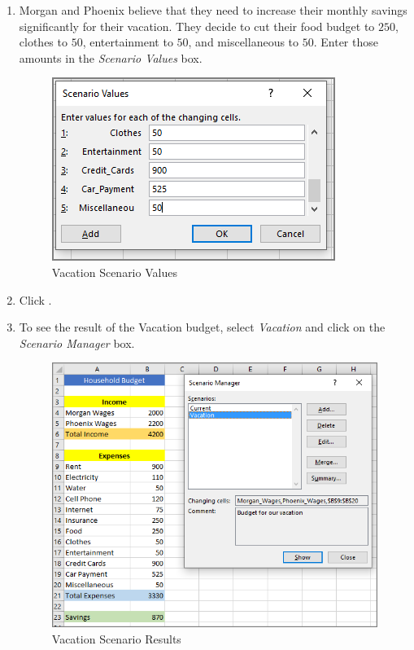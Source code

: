 \begin{enumbox}
\begin{enumerate}
		\item Morgan and Phoenix believe that they need to increase their monthly savings significantly for their vacation. They decide to cut their food budget to $ 250 $, clothes to $ 50 $, entertainment to $ 50 $, and miscellaneous to $ 50 $. Enter those amounts in the \textit{Scenario Values} box.
	
		\begin{figure}[H]
			\centering
			\includegraphics[width=\maxwidth{.65\linewidth}]{gfx/ch08_fig55}
			\caption{Vacation Scenario Values}
			\label{08:fig55}
		\end{figure}

		\item Click .
		\item To see the result of the Vacation budget, select \textit{Vacation} and click  on the \textit{Scenario Manager} box.
	
		\begin{figure}[H]
			\centering
			\includegraphics[width=\maxwidth{.95\linewidth}]{gfx/ch08_fig56}
			\caption{Vacation Scenario Results}
			\label{08:fig56}
		\end{figure}


\end{enumerate}
\end{enumbox}
